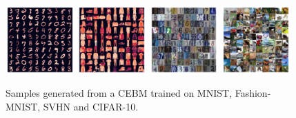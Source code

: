 \documentclass{article}
\begin{document}
\begin{figure}[!t]
\centering
\includegraphics[width=0.235\textwidth]{figures/mnist_cebm_buffer_samples.pdf}
\includegraphics[width=0.235\textwidth]{figures/fmnist_cebm_samples.pdf}
\includegraphics[width=0.235\textwidth]{figures/svhn_cebm_buffer_samples3.pdf}
\includegraphics[width=0.235\textwidth]{figures/cifar10_cebm_buffer_samples.pdf}
\vspace*{-1.5ex}
\caption{Samples generated from a CEBM trained on MNIST, Fashion-MNIST, SVHN and CIFAR-10.}
\vspace*{-1.0ex}
\label{fig:generated-samples}
\end{figure}
\end{document}

